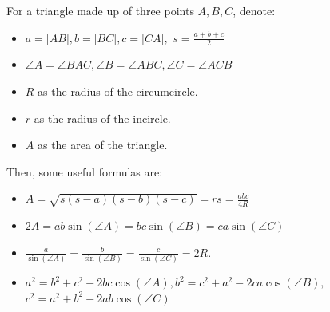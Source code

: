 For a triangle made up of three points $A,B,C$, denote:
\begin{itemize}
    \item $a = |AB|, b = |BC|, c = |CA|,$ $\displaystyle s = \frac{a+b+c}{2}$

    \item $\angle A = \angle BAC, \angle B = \angle ABC, \angle C = \angle ACB$

    \item $R$ as the radius of the circumcircle.

    \item $r$ as the radius of the incircle.

    \item $A$ as the area of the triangle.
\end{itemize}

Then, some useful formulas are:
\begin{itemize}
    \item $\displaystyle A = \sqrt{s(s - a)(s - b)(s - c)} = rs = \frac{abc}{4R}$

    \item $\displaystyle 2A = ab \sin (\angle A) = bc \sin (\angle B) = ca \sin (\angle C)$

    \item $\displaystyle \frac{a}{\sin (\angle A)} = \frac{b}{\sin (\angle B)} = \frac{c}{\sin (\angle C)} = 2R.$

    \item $a^2 = b^2 + c^2 - 2bc \cos (\angle A), b^2 = c^2 + a^2 - 2ca \cos (\angle B),$
    $c^2 = a^2 + b^2 - 2ab \cos (\angle C)$
\end{itemize}